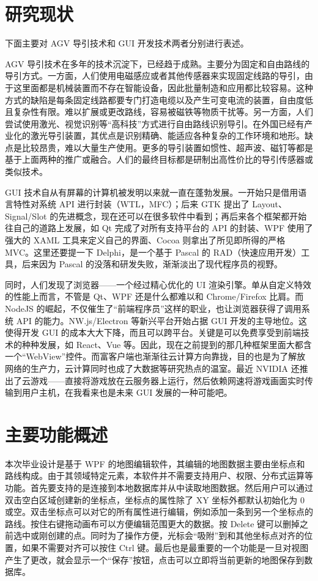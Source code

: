 \section{研究现状}

下面主要对 AGV 导引技术和 GUI 开发技术两者分别进行表述。

AGV 导引技术在多年的技术沉淀下，已经趋于成熟。主要分为固定和自由路线的导引方式。一方面，人们使用电磁感应或者其他传感器来实现固定线路的导引，由于这里面都是机械装置而不存在智能设备，因此批量制造和应用都比较容易。这种方式的缺陷是每条固定线路都要专门打造电缆以及产生可变电流的装置，自由度低且复杂性有限。难以扩展或更改路线，容易被磁铁等物质干扰等。另一方面，人们尝试使用激光、视觉识别等``高科技''方式进行自由路线识别导引。在外国已经有产业化的激光导引装置，其优点是识别精确、能适应各种复杂的工作环境和地形。缺点是比较昂贵，难以大量生产使用。更多的导引装置如惯性、超声波、磁钉等都是基于上面两种的推广或融合。人们的最终目标都是研制出高性价比的导引传感器或类似技术。

GUI 技术自从有屏幕的计算机被发明以来就一直在蓬勃发展。一开始只是借用语言特性对系统 API 进行封装（WTL，MFC）；后来 GTK 提出了 Layout、Signal/Slot 的先进概念，现在还可以在很多软件中看到；再后来各个框架都开始往自己的道路上发展，如 Qt 完成了对所有支持平台的 API 的封装、WPF 使用了强大的 XAML 工具来定义自己的界面、Cocoa 则拿出了所见即所得的严格 MVC。这里还要提一下 Delphi，是一个基于 Pascal 的 RAD（快速应用开发）工具，后来因为 Pascal 的没落和研发失败，渐渐淡出了现代程序员的视野。

同时，人们发现了浏览器——一个经过精心优化的 UI 渲染引擎。单从自定义特效的性能上而言，不管是 Qt、WPF 还是什么都难以和 Chrome/Firefox 比肩。而 NodeJS 的崛起，不仅催生了``前端程序员''这样的职业，也让浏览器获得了调用系统 API 的能力。NW.js/Electron 等新兴平台开始占据 GUI 开发的主导地位。这使得开发 GUI 的成本大大下降，而且可以跨平台。关键是可以免费享受到前端技术的种种发展，如 React、Vue 等。因此，现在之前提到的那几种框架里面大都含一个``WebView''控件。而富客户端也渐渐往云计算方向靠拢，目的也是为了解放网络的生产力，云计算同时也成了大数据等研究热点的温室。最近 NVIDIA 还推出了云游戏——直接将游戏放在云服务器上运行，然后依赖网速将游戏画面实时传输到用户主机，在我看来也是未来 GUI 发展的一种可能吧。

\section{主要功能概述}

本次毕业设计是基于 WPF 的地图编辑软件，其编辑的地图数据主要由坐标点和路线构成。由于其领域特定元素，本软件并不需要支持用户、权限、分布式运算等功能。首先要支持的是连接到本地数据库并从中读取地图数据。然后用户可以通过双击空白区域创建新的坐标点，坐标点的属性除了 XY 坐标外都默认初始化为 0 或空。双击坐标点可以对它的所有属性进行编辑，例如添加一条到另一个坐标点的路线。按住右键拖动画布可以方便编辑范围更大的数据。按 Delete 键可以删掉之前选中或刚创建的点。同时为了操作方便，光标会``吸附''到和其他坐标点对齐的位置，如果不需要对齐可以按住 Ctrl 键。最后也是最重要的一个功能是一旦对视图产生了更改，就会显示一个``保存''按钮，点击可以立即将当前更新的地图保存到数据库。

